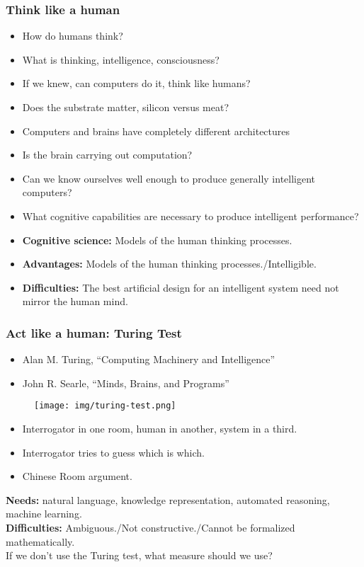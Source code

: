 \documentclass[UTF8,11pt,colorlinks,compress,openany]{beamer}%
\begin{document}
\begin{frame}\frametitle{Think like a human}
\begin{itemize}
	\item How do humans think?
	\item What is thinking, intelligence, consciousness?
	\item If we knew, can computers do it, think like humans?
	\item Does the substrate matter, silicon versus meat?
	\item Computers and brains have completely different architectures
	\item Is the brain carrying out computation?
	\item Can we know ourselves well enough to produce generally intelligent computers?
	\item What cognitive capabilities are necessary to produce intelligent performance?
	\item \textbf{Cognitive science:} Models of the human thinking processes.
	\item \textbf{Advantages:} Models of the human thinking processes./Intelligible.
	\item \textbf{Difficulties:} The best artificial design for an intelligent system need not mirror the human mind.
\end{itemize}
\end{frame}

\begin{frame}\frametitle{Act like a human: Turing Test}
\begin{itemize}
	\item Alan M. Turing, ``Computing Machinery and Intelligence''
	\item John R. Searle, ``Minds, Brains, and Programs''
\end{itemize}
\begin{figure}
\texttt{[image: img/turing-test.png]}
\end{figure}
\begin{itemize}
	\item Interrogator in one room, human in another, system in a third.
	\item Interrogator tries to guess which is which.
	\item Chinese Room argument.
\end{itemize}
\textbf{Needs:} natural language, knowledge representation, automated reasoning, machine learning.\\
\textbf{Difficulties:} Ambiguous./Not constructive./Cannot be formalized mathematically.\\
\centering If we don't use the Turing test, what measure should we use?
\end{frame}
\end{document}
